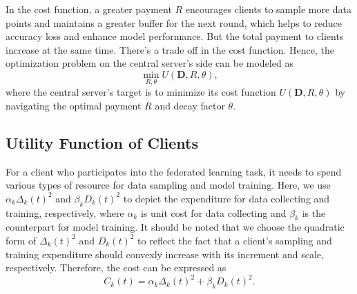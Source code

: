 \documentclass{article}
\theoremstyle{plain}
\theoremstyle{definition}
\theoremstyle{remark}
\begin{document}
In the cost function, a greater payment $R$ encourages clients to sample more data points and maintains a greater buffer for the next round, which helps to reduce accuracy loss and enhance model performance. But the total payment to clients increase at the same time. There's a trade off in the cost function.
Hence, the optimization problem on the central server's side can be modeled as
\begin{equation}
  \min_{R,\theta}  U(\boldsymbol{D}, R, \theta), 
\end{equation}
where the central server's target is to minimize its cost function $U(\boldsymbol{D}, R, \theta)$ by navigating the optimal payment $R$ and decay factor $\theta$.

\subsection{Utility Function of Clients}
For a client who participates into the federated learning task, it needs to spend various types of resource for data sampling and model training.
Here, we use $\alpha_k \Delta_k(t)^2$ and $\beta_k D_k(t)^2$ to depict the expenditure for data collecting and training, respectively, where $\alpha_k$ is unit cost for data collecting and $\beta_k$ is the counterpart for model training.
It should be noted that we choose the quadratic form of $\Delta_k(t)^2$ and $D_k(t)^2$ to reflect the fact that a client's sampling and training expenditure should convexly increase with its increment and scale, respectively.
Therefore, the cost can be expressed as
\begin{equation}
  C_k(t) = \alpha_k \Delta_k(t)^2 + \beta_k D_k(t)^2.
\end{equation}
\end{document}
